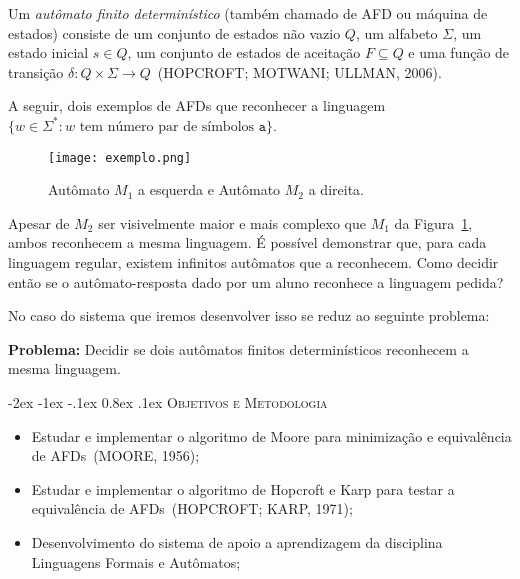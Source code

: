 \documentclass[plainsections, a0,  25pt]{sciposter} %
\makeatletter
\newcommand{\largo}{\fontsize{36}{40}\selectfont } %
\renewcommand\section{\@startsection {section}{1}{\z@}%
                                   {-2ex \@plus -1ex \@minus -.1ex}%
                                   {0.8ex \@plus.1ex}%
                                   {\normalfont\largo\bfseries}}
\makeatother
\begin{document}
\begin{multicols}{3}
Um \textit{autômato finito determinístico} (também chamado de AFD ou máquina de estados) consiste de um conjunto de estados não vazio $Q$, um alfabeto $\Sigma$, um estado inicial $s \in Q$, um conjunto de estados de aceitação $F \subseteq Q$ e uma função de transição $\delta \colon Q \times \Sigma \rightarrow Q$~(HOPCROFT; MOTWANI; ULLMAN, 2006).

A seguir, dois exemplos de AFDs que reconhecer a linguagem
$\{w \in \Sigma^* :  w \text{ tem número par de símbolos } \mathtt{a}\}$.

\begin{figure}
  \centering
  \texttt{[image: exemplo.png]}
  \caption{Autômato $M_1$ a esquerda e Autômato $M_2$ a direita.}
  \label{fig:exemplo}
  \vspace{-2cm}
\end{figure}

Apesar de $M_2$ ser visivelmente maior e mais complexo que $M_1$ da Figura~\ref{fig:exemplo}, ambos reconhecem a mesma linguagem. É possível demonstrar que, para cada linguagem regular, existem infinitos autômatos que a reconhecem. Como decidir então se o autômato-resposta dado por um aluno reconhece a linguagem pedida? 

No caso do sistema que iremos desenvolver isso se reduz ao seguinte problema:
  
  
{\LARGE
  \noindent\textbf{Problema:} Decidir se dois autômatos finitos determinísticos reconhecem a mesma linguagem.\par
}

\columnbreak



\section{\textsc{Objetivos e Metodologia}}

\begin{itemize}
\item Estudar e implementar o algoritmo de Moore para minimização e equivalência de AFDs~(MOORE, 1956);

\item Estudar e implementar o algoritmo de Hopcroft e Karp para testar a equivalência de AFDs~(HOPCROFT; KARP, 1971); 

\item Desenvolvimento do sistema de apoio a aprendizagem da disciplina Linguagens Formais e Autômatos;


\end{itemize}
\end{multicols}
\end{document}
